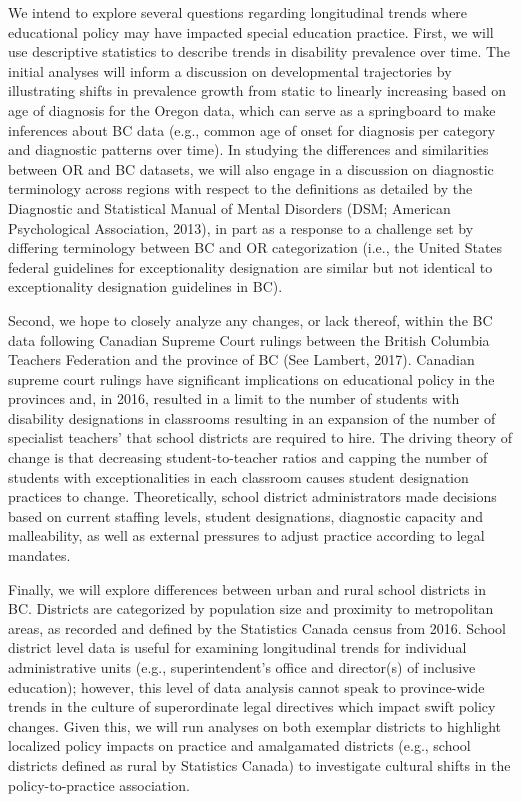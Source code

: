 \documentclass[
  english,
  man]{apa6}
\begin{document}
We intend to explore several questions regarding longitudinal trends where educational policy may have impacted special education practice. First, we will use descriptive statistics to describe trends in disability prevalence over time. The initial analyses will inform a discussion on developmental trajectories by illustrating shifts in prevalence growth from static to linearly increasing based on age of diagnosis for the Oregon data, which can serve as a springboard to make inferences about BC data (e.g., common age of onset for diagnosis per category and diagnostic patterns over time). In studying the differences and similarities between OR and BC datasets, we will also engage in a discussion on diagnostic terminology across regions with respect to the definitions as detailed by the Diagnostic and Statistical Manual of Mental Disorders (DSM; American Psychological Association, 2013), in part as a response to a challenge set by differing terminology between BC and OR categorization (i.e., the United States federal guidelines for exceptionality designation are similar but not identical to exceptionality designation guidelines in BC).

Second, we hope to closely analyze any changes, or lack thereof, within the BC data following Canadian Supreme Court rulings between the British Columbia Teachers Federation and the province of BC (See Lambert, 2017). Canadian supreme court rulings have significant implications on educational policy in the provinces and, in 2016, resulted in a limit to the number of students with disability designations in classrooms resulting in an expansion of the number of specialist teachers' that school districts are required to hire. The driving theory of change is that decreasing student-to-teacher ratios and capping the number of students with exceptionalities in each classroom causes student designation practices to change. Theoretically, school district administrators made decisions based on current staffing levels, student designations, diagnostic capacity and malleability, as well as external pressures to adjust practice according to legal mandates.

Finally, we will explore differences between urban and rural school districts in BC. Districts are categorized by population size and proximity to metropolitan areas, as recorded and defined by the Statistics Canada census from 2016. School district level data is useful for examining longitudinal trends for individual administrative units (e.g., superintendent's office and director(s) of inclusive education); however, this level of data analysis cannot speak to province-wide trends in the culture of superordinate legal directives which impact swift policy changes. Given this, we will run analyses on both exemplar districts to highlight localized policy impacts on practice and amalgamated districts (e.g., school districts defined as rural by Statistics Canada) to investigate cultural shifts in the policy-to-practice association.
\end{document}
